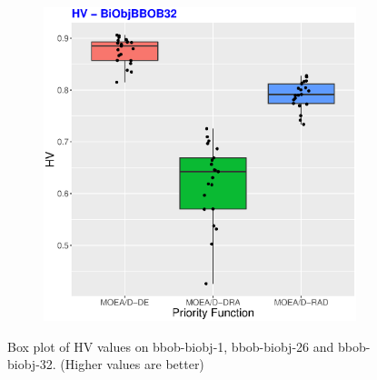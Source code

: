 \begin{figure}[!t]
\begin{subfigure}[b]{0.33\textwidth}
	\end{subfigure}
	\begin{subfigure}[b]{0.33\textwidth}
		\centering
		\includegraphics[width=1\textwidth, height=1\textwidth]{img/BiObjBBOB32_HV.eps}
	\end{subfigure}
	\caption{Box plot of HV values on  bbob-biobj-1,  bbob-biobj-26 and  bbob-biobj-32. (Higher values are better)}
	\label{HVS}
\end{figure}

